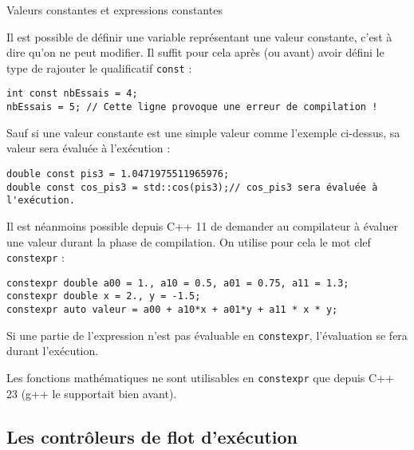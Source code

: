 \documentclass[compress,10pt,aspectratio=169]{beamer}
\begin{document}
\begin{frame}[fragile]{Valeurs constantes et expressions constantes}
    \scriptsize
  
Il est possible de définir une variable représentant une valeur constante, c'est à dire qu'on ne peut modifier.
Il suffit pour cela après (ou avant) avoir défini le type de rajouter le qualificatif \texttt{const} :
\begin{verbatim}
int const nbEssais = 4;
nbEssais = 5; // Cette ligne provoque une erreur de compilation !
\end{verbatim}
  
Sauf si une valeur constante est une simple valeur comme l'exemple ci-dessus, sa valeur sera évaluée à l'exécution :
  
\begin{verbatim}
double const pis3 = 1.0471975511965976;
double const cos_pis3 = std::cos(pis3);// cos_pis3 sera évaluée à l'exécution.
\end{verbatim}
  
Il est néanmoins possible depuis C++ 11 de demander au compilateur à évaluer une valeur durant la phase de compilation.
On utilise pour cela le mot clef \texttt{constexpr} :
\begin{verbatim}
constexpr double a00 = 1., a10 = 0.5, a01 = 0.75, a11 = 1.3;
constexpr double x = 2., y = -1.5;
constexpr auto valeur = a00 + a10*x + a01*y + a11 * x * y;
\end{verbatim}
  
Si une partie de l'expression n'est pas évaluable en \texttt{constexpr}, l'évaluation se fera durant l'exécution.
  
Les fonctions mathématiques ne sont utilisables en \texttt{constexpr} que depuis C++ 23 (g++ le supportait bien avant).
\end{frame}
  
\subsection{Les contrôleurs de flot d'exécution}
\end{document}
